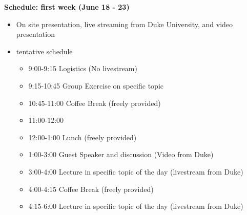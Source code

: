 \documentclass{beamer}
\begin{document}
\begin{frame}[fragile]
\begin{columns}[T]
\begin{column}{.48\textwidth}

\end{column}

\begin{column}{.48\textwidth}

\begin{block}{\textbf{Schedule: first week (June 18 - 23)}}
\begin{itemize}
\item On site presentation, live streaming from Duke University, and video presentation
\item tentative schedule
\begin{itemize}
	\item 9:00-9:15 Logistics (No livestream)
	\item 9:15-10:45 Group Exercise on specific topic
	\item 10:45-11:00 Coffee Break (freely provided)
	\item 11:00-12:00
	\item 12:00-1:00 Lunch (freely provided)
	\item 1:00-3:00 Guest Speaker and discussion (Video from Duke)
	\item 3:00-4:00 Lecture in specific topic of the day (livestream from Duke)
	\item 4:00-4:15 Coffee Break (freely provided)
	\item 4:15-6:00 Lecture in specific topic of the day (livestream from Duke)
\end{itemize}



\end{itemize}
\end{block}
\end{column}
\end{columns}
\end{frame}
\end{document}
